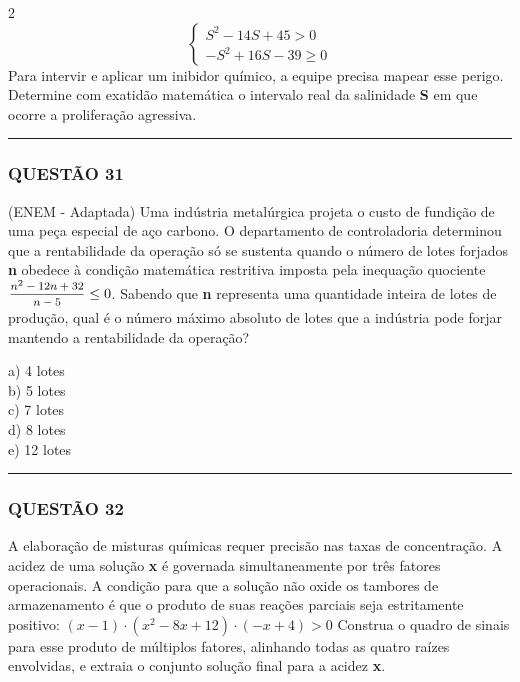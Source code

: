 \documentclass[twoside, 10pt, a4paper]{article}
\begin{document}
\begin{multicols*}{2}
$$ \begin{cases} S^2 - 14S + 45 > 0 \\ -S^2 + 16S - 39 \ge 0 \end{cases} $$
Para intervir e aplicar um inibidor químico, a equipe precisa mapear esse perigo. Determine com exatidão matemática o intervalo real da salinidade \textbf{S} em que ocorre a proliferação agressiva.

\vspace{0cm} \noindent\textcolor{CorLinha}{\rule{\linewidth}{0.5pt}} \vspace{-0.2cm}
\subsubsection*{QUESTÃO 31}
(ENEM - Adaptada) Uma indústria metalúrgica projeta o custo de fundição de uma peça especial de aço carbono. O departamento de controladoria determinou que a rentabilidade da operação só se sustenta quando o número de lotes forjados \textbf{n} obedece à condição matemática restritiva imposta pela inequação quociente $ \mfrac{n^2 - 12n + 32}{n - 5} \le 0 $. Sabendo que \textbf{n} representa uma quantidade inteira de lotes de produção, qual é o número máximo absoluto de lotes que a indústria pode forjar mantendo a rentabilidade da operação?

a) 4 lotes\\[0.3cm]
b) 5 lotes\\[0.3cm]
c) 7 lotes\\[0.3cm]
d) 8 lotes\\[0.3cm]
e) 12 lotes\\[0.3cm]

\vspace{0cm} \noindent\textcolor{CorLinha}{\rule{\linewidth}{0.5pt}} \vspace{-0.2cm}
\subsubsection*{QUESTÃO 32}
A elaboração de misturas químicas requer precisão nas taxas de concentração. A acidez de uma solução \textbf{x} é governada simultaneamente por três fatores operacionais. A condição para que a solução não oxide os tambores de armazenamento é que o produto de suas reações parciais seja estritamente positivo:
$ (x - 1) \cdot (x^2 - 8x + 12) \cdot (-x + 4) > 0 $
Construa o quadro de sinais para esse produto de múltiplos fatores, alinhando todas as quatro raízes envolvidas, e extraia o conjunto solução final para a acidez \textbf{x}.


\end{multicols*}
\end{document}
